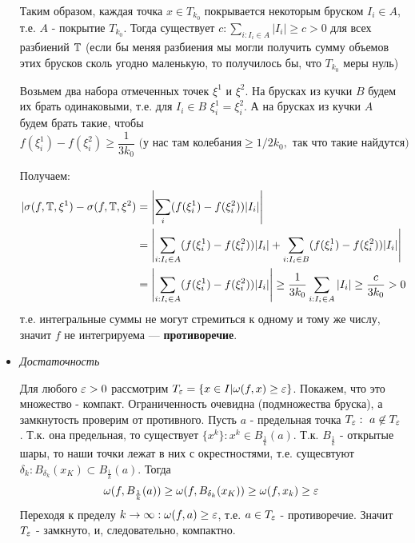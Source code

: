 \documentclass[a4paper]{article}
\begin{document}
\begin{itemize}
    Таким образом, каждая точка $x\in T_{k_0}$ покрывается некоторым бруском $I_i \in A$, т.е. $A$ - покрытие $T_{k_0}$. Тогда существует $c: \displaystyle\sum_{i:I_i\in A}|I_i| \ge c > 0$ для всех разбиений $\operatorname{\mathbb{T}}$ (если бы меняя разбиения мы могли получить сумму объемов этих брусков сколь угодно маленькую, то получилось бы, что $T_{k_0}$ меры нуль)

    Возьмем два набора отмеченных точек $\xi^1$ и $\xi^2$. На брусках из кучки $B$ будем их брать одинаковыми, т.е. для $I_i\in B \,\, \xi_i^1 = \xi_i^2$. А на брусках из кучки $A$ будем брать такие, чтобы 
    \begin{equation*}
        f(\xi_i^1) - f(\xi_i^2) \ge \frac{1}{3k_0} \text{ (у нас там колебания} \ge 1/2k_0, \text{ так что такие найдутся)}
    \end{equation*}

    Получаем:
    \begin{equation*}
        \begin{aligned}
            |\sigma(f, \T, \xi^1) - \sigma(f, \T, \xi^2) &= \left|\sum_i(f(\xi_i^1) - f(\xi_i^2))|I_i|\right|\\
            &= \left|\sum_{i: I_i\in A}(f(\xi_i^1) - f(\xi_i^2))|I_i| + \sum_{i:I_i\in B}(f(\xi_i^1) - f(\xi_i^2))|I_i|\right|\\
            &= \left|\sum_{i: I_i\in A} (f(\xi_i^1) - f(\xi_i^2))|I_i|\right| \ge \frac{1}{3k_0} \sum_{i:I_i\in A}|I_i| \ge \frac{c}{3k_0} > 0
        \end{aligned}
    \end{equation*}
    т.е. интегральные суммы не могут стремиться к одному и тому же числу, значит $f$ не интегрируема --- \textbf{противоречие}.

    \item \textit{Достаточность}

    Для любого $\operatorname{\varepsilon} > 0$ рассмотрим $T_{\operatorname{\varepsilon}} = \{x\in I| \omega(f, x) \ge \operatorname{\varepsilon}\}$. Покажем, что это множество - компакт. Ограниченность очевидна (подмножества бруска), а замкнутость проверим от противного. Пусть $a$ - предельная точка $T_{\operatorname{\varepsilon}}: \,\, a\not\in T_{\operatorname{\varepsilon}}$. Т.к. она предельная, то существует $\{x^k\}: x^k \in B_{\frac{1}{k}}(a)$. Т.к. $B_{\frac{1}{k}}$ - открытые шары, то наши точки лежат в них с окрестностями, т.е. сущесвтуют $\delta_k : B_{\delta_k}(x_K) \subset B_{\frac{1}{k}}(a)$. Тогда
    \begin{equation*}
        \omega(f, B_{\frac{1}{k}}(a)) \ge \omega(f, B_{\delta_k}(x_K)) \ge \omega(f, x_k) \ge \operatorname{\varepsilon}
    \end{equation*}
    Переходя к пределу $k\to\infty : \omega(f, a) \ge \operatorname{\varepsilon}$, т.е. $a\in T_{\operatorname{\varepsilon}}$ - противоречие. Значит $T_{\operatorname{\varepsilon}}$ - замкнуто, и, следовательно, компактно.


\end{itemize}
\end{document}
